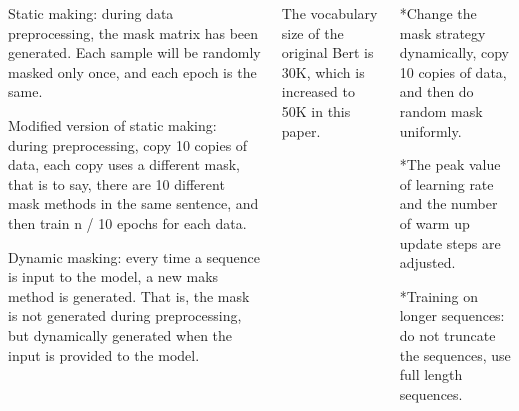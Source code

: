 \documentclass{tikzposter} %
\begin{document}
\begin{columns}
{}

{
\begin{description}

  	\item
    Static making: during data preprocessing, the mask matrix has been generated. 
    Each sample will be randomly masked only once, and each epoch is the same.

    \item
    Modified version of static making: during preprocessing, copy 10 copies of data,
    each copy uses a different mask, that is to say, there are 10 different mask
    methods in the same sentence, and then train n / 10 epochs for each data.

    \item
    Dynamic masking: every time a sequence is input to the model, 
    a new maks method is generated. That is, the mask is not generated 
    during preprocessing, but dynamically generated when the input is provided 
    to the model.
\end{description}
}


{
\begin{description}
  	\item
    The vocabulary size of the original Bert is 30K, which is increased to 50K in
    this paper.
\end{description}
}

{
\begin{description}
  	
  \item
  *Change the mask strategy dynamically, copy 10 copies of data, and
  then do random mask uniformly.
  \item
  *The peak value of learning rate and the number of warm up
  update steps are adjusted.
  \item
  *Training on longer sequences: do not truncate the sequences,
  use full length sequences.
\end{description}
}









\end{columns}
\end{document}
